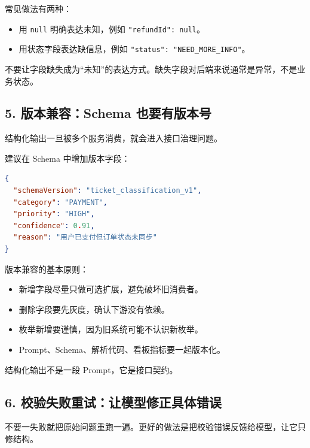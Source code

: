 \documentclass[10pt,a4paper]{ctexart}
\begin{document}
常见做法有两种：


\begin{itemize}[itemsep=2pt, topsep=4pt]
  \item 用 \texttt{null} 明确表达未知，例如 \texttt{"refundId": null}。
  \item 用状态字段表达缺信息，例如 \texttt{"status": "NEED\_MORE\_INFO"}。
\end{itemize}


不要让字段缺失成为“未知”的表达方式。缺失字段对后端来说通常是异常，不是业务状态。



\subsection{5. 版本兼容：Schema 也要有版本号}


结构化输出一旦被多个服务消费，就会进入接口治理问题。



建议在 Schema 中增加版本字段：



\begin{lstlisting}[language=json]
{
  "schemaVersion": "ticket_classification_v1",
  "category": "PAYMENT",
  "priority": "HIGH",
  "confidence": 0.91,
  "reason": "用户已支付但订单状态未同步"
}
\end{lstlisting}



版本兼容的基本原则：


\begin{itemize}[itemsep=2pt, topsep=4pt]
  \item 新增字段尽量只做可选扩展，避免破坏旧消费者。
  \item 删除字段要先灰度，确认下游没有依赖。
  \item 枚举新增要谨慎，因为旧系统可能不认识新枚举。
  \item Prompt、Schema、解析代码、看板指标要一起版本化。
\end{itemize}


结构化输出不是一段 Prompt，它是接口契约。



\subsection{6. 校验失败重试：让模型修正具体错误}


不要一失败就把原始问题重跑一遍。更好的做法是把校验错误反馈给模型，让它只修结构。
\end{document}
